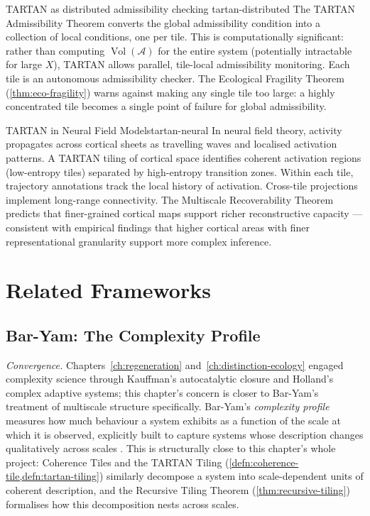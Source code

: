 \documentclass[12pt,twoside,openright]{book}
\newcommand{\bioicon}{\marginpar{\tiny\color{DistTeal}\faDna}}
\newcommand{\adm}{\mathcal{A}}
\newcommand{\Vol}{\operatorname{Vol}}
\begin{document}
\begin{remark}{TARTAN as distributed admissibility checking}%
  {tartan-distributed}
  The TARTAN Admissibility Theorem converts the global
  admissibility condition into a collection of local
  conditions, one per tile. This is computationally
  significant: rather than computing $\Vol(\adm)$ for
  the entire system (potentially intractable for large
  $X$), TARTAN allows parallel, tile-local admissibility
  monitoring. Each tile is an autonomous admissibility
  checker. The Ecological Fragility Theorem
  (\cref{thm:eco-fragility}) warns against making any
  single tile too large: a highly concentrated tile
  becomes a single point of failure for global
  admissibility.
\end{remark}

\begin{example}{TARTAN in Neural Field Models}{tartan-neural}
  \bioicon
  In neural field theory, activity propagates across
  cortical sheets as travelling waves and localised
  activation patterns. A TARTAN tiling of cortical space
  identifies coherent activation regions (low-entropy
  tiles) separated by high-entropy transition zones.
  Within each tile, trajectory annotations track the
  local history of activation. Cross-tile projections
  implement long-range connectivity. The Multiscale
  Recoverability Theorem predicts that finer-grained
  cortical maps support richer reconstructive capacity
  — consistent with empirical findings that higher
  cortical areas with finer representational granularity
  support more complex inference.
\end{example}

\section{Related Frameworks}
\label{sec:ch26-related-frameworks}

\subsection*{Bar-Yam: The Complexity Profile}

\emph{Convergence.} Chapters~\ref{ch:regeneration}
and~\ref{ch:distinction-ecology} engaged complexity science
through Kauffman's autocatalytic closure and Holland's complex
adaptive systems; this chapter's concern is closer to Bar-Yam's
treatment of multiscale structure specifically. Bar-Yam's
\emph{complexity profile} measures how much behaviour a system
exhibits as a function of the scale at which it is observed,
explicitly built to capture systems whose description changes
qualitatively across scales \parencite{baryam1997}. This is
structurally close to this chapter's whole project: Coherence
Tiles and the TARTAN Tiling
(\cref{defn:coherence-tile,defn:tartan-tiling}) similarly
decompose a system into scale-dependent units of coherent
description, and the Recursive Tiling Theorem
(\cref{thm:recursive-tiling}) formalises how this decomposition
nests across scales.
\end{document}
